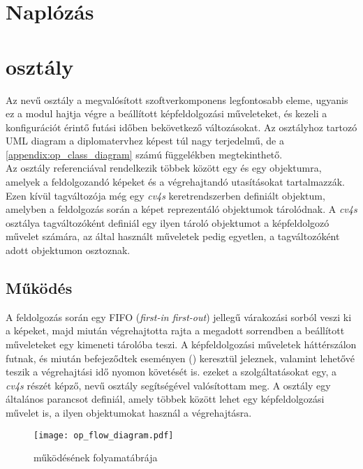 \section{Naplózás}

\section{ osztály}

Az  nevű osztály a megvalósított szoftverkomponens legfontosabb eleme, ugyanis ez a modul hajtja végre a beállított képfeldolgozási műveleteket, és kezeli a konfigurációt érintő futási időben bekövetkező változásokat. Az osztályhoz tartozó UML diagram a diplomatervhez képest túl nagy terjedelmű, de a \ref{appendix:op_class_diagram} számú függelékben megtekinthető.\\
Az osztály referenciával rendelkezik többek között egy  és egy  objektumra, amelyek a feldolgozandó képeket és a végrehajtandó utasításokat tartalmazzák. Ezen kívül tagváltozója még egy \emph{cv4s} keretrendszerben definiált  objektum, amelyben a feldolgozás során a képet reprezentáló  objektumok tárolódnak. A \emph{cv4s}  osztálya tagváltozóként definiál egy ilyen tároló objektumot a képfeldolgozó művelet számára, az  által használt műveletek pedig egyetlen, a tagváltozóként adott  objektumon osztoznak. 

\subsection{Működés} \label{ssection:mukodes} A feldolgozás során egy FIFO (\textit{first-in first-out}) jellegű várakozási sorból veszi ki a képeket, majd miután végrehajtotta rajta a megadott sorrendben a beállított műveleteket egy kimeneti tárolóba teszi. A képfeldolgozási műveletek háttérszálon futnak, és miután befejeződtek eseményen () keresztül jeleznek, valamint lehetővé teszik a végrehajtási idő nyomon követését is. ezeket a szolgáltatásokat egy, a \emph{cv4s} részét képző,  nevű osztály segítségével valósítottam meg. A  osztály egy általános parancsot definiál, amely többek között lehet egy képfeldolgozási művelet is, a  ilyen objektumokat használ a végrehajtásra.

\begin{figure}[h]
\texttt{[image: op\_flow\_diagram.pdf]}
\centering
\caption{ működésének folyamatábrája}
\label{fig:op_flow_diagram}
\end{figure}

